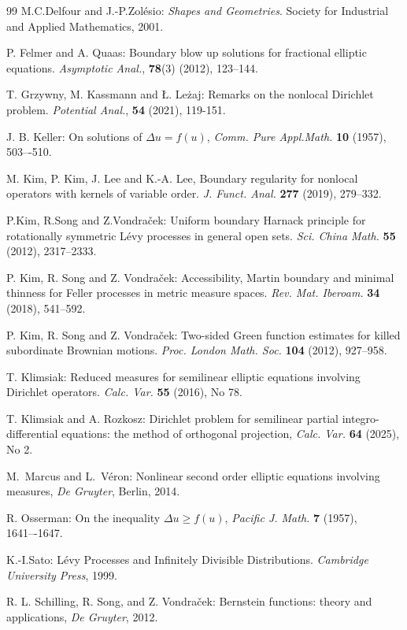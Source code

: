 \documentclass[a4paper,12pt,draft]{article}
\theoremstyle{plain}
\theoremstyle{definition}
\numberwithin{equation}{section}
\renewcommand{\ge}{\geqslant}
\newcommand{\1}{1}
\begin{document}
\begin{thebibliography}{99}
	M.C.Delfour and J.-P.Zol\' esio:
\emph{Shapes and Geometries}. Society for Industrial and Applied Mathematics, 2001.

 P. Felmer and A. Quaas: Boundary blow up solutions for fractional elliptic equations. \emph{Asymptotic Anal.}, {\bf 78}(3) (2012), 123--144. 

 T. Grzywny,  M. Kassmann and \L. Le\.{z}aj: Remarks on the nonlocal Dirichlet problem. \emph{Potential Anal.}, {\bf 54} (2021), 119-151. 

 J. B. Keller: On solutions of $ \Delta u= f(u)$, \emph{Comm. Pure Appl.Math.} {\bf 10} (1957), 503–-510.


 M. Kim, P. Kim, J. Lee and  K.-A. Lee, Boundary regularity for nonlocal operators with kernels of variable order. \emph{J. Funct. Anal.} \textbf{277} (2019), 279--332.

	P.Kim, R.Song and Z.Vondra\v cek:
Uniform boundary Harnack principle for rotationally symmetric L\'evy processes in general open sets.  \emph{Sci. China Math.} {\bf 55} (2012), 2317--2333.

 P. Kim, R. Song and  Z. Vondra\v{c}ek: Accessibility, Martin boundary and minimal thinness for Feller processes in metric measure spaces. \emph{Rev. Mat. Iberoam.} \textbf{34} (2018),  541--592.

 P. Kim, R. Song and  Z. Vondra\v{c}ek: Two-sided Green function estimates for killed subordinate Brownian motions. \emph{Proc. London Math. Soc.} \textbf{104} (2012), 927--958.

 T. Klimsiak: Reduced measures for semilinear elliptic equations involving Dirichlet operators. \emph{Calc. Var.} \textbf{55} (2016), No 78.

    T. Klimsiak and A. Rozkosz: Dirichlet problem for semilinear partial integro-differential
              equations: the method of orthogonal projection,
 \emph{Calc. Var.} {\bf 64} (2025), No 2.

   M.~Marcus and L.~V\' eron:
    Nonlinear second order elliptic equations involving measures, \emph{De Gruyter}, Berlin, 2014.


 R. Osserman: On the inequality $\Delta u \ge f(u)$, \emph{Pacific J. Math.} {\bf7} (1957), 1641–-1647.

    

    K.-I.Sato:
L\' evy  Processes  and  Infinitely  Divisible  Distributions.  \emph{Cambridge  University  Press}, 1999.

 R. L. Schilling, R. Song, and Z. Vondra\v cek: Bernstein functions: theory
and applications, \emph{De Gruyter}, 2012.
    


\end{thebibliography}
\end{document}
